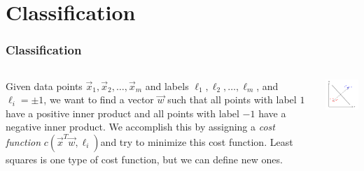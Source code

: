 \section{Classification}

\begin{frame}
    \frametitle{Classification}

    \begin{columns}
        \begin{column}{0.5\textwidth}
            Given data points \(\vec{x}_1, \vec{x}_2, \ldots, \vec{x}_m\) and labels \(\ell_1, \ell_2, \ldots, \ell_m\), and \(\ell_i = \pm 1\), we want to find a vector \(\vec{w}\) such that all points with label \(1\) have a positive inner product and all points with label \(-1\) have a negative inner product.
            We accomplish this by assigning a \emph{cost function} \(c(\vec{x}^T \vec{w}, \ell_i)\)and try to minimize this cost function.
            Least squares is one type of cost function, but we can define new ones.
        \end{column}
        \begin{column}{0.5\textwidth}
            \includegraphics[width=\textwidth]{images/classification.png}
        \end{column}
    \end{columns}
\end{frame}

